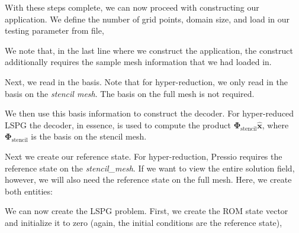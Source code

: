 With these steps complete, we can now proceed with constructing our application. We define the number of grid points, domain size, and load in our testing parameter from file, 
\begin{DoxyCode}{0}
\end{DoxyCode}


We note that, in the last line where we construct the application, the construct additionally requires the sample mesh information that we had loaded in.

Next, we read in the basis. Note that for hyper-\/reduction, we only read in the basis on the {\itshape stencil mesh}. The basis on the full mesh is not required. 
\begin{DoxyCode}{0}
\end{DoxyCode}


We then use this basis information to construct the decoder. For hyper-\/reduced L\+S\+PG the decoder, in essence, is used to compute the product $\boldsymbol \Phi_{\text{stencil}} \hat{\boldsymbol x} $, where $\boldsymbol \Phi_{\text{stencil}}$ is the basis on the stencil mesh. 
\begin{DoxyCode}{0}
\end{DoxyCode}


Next we create our reference state. For hyper-\/reduction, Pressio requires the reference state on the {\itshape stencil\+\_\+mesh}. If we want to view the entire solution field, however, we will also need the reference state on the full mesh. Here, we create both entities\+: 
\begin{DoxyCode}{0}
\end{DoxyCode}


We can now create the L\+S\+PG problem. First, we create the R\+OM state vector and initialize it to zero (again, the initial conditions are the reference state), 
\begin{DoxyCode}{0}
\end{DoxyCode}


